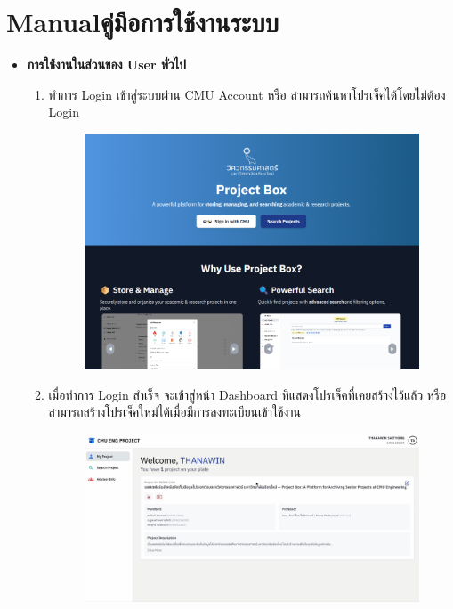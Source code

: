 \chapter{\ifenglish Manual\else คู่มือการใช้งานระบบ\fi}
\begin{itemize}
    \item \textbf{\Large การใช้งานในส่วนของ User ทั่วไป}
\begin{enumerate}
    \item ทำการ Login เข้าสู่ระบบผ่าน CMU Account หรือ สามารถค้นหาโปรเจ็คได้โดยไม่ต้อง Login 
    \begin{figure}[H]
    \centering
    \includegraphics[width=130mm, keepaspectratio ]{pictures/project_box/loginpage.png}
    \end{figure}
    \vspace{1cm}
    \item เมื่อทำการ Login สำเร็จ จะเข้าสู่หน้า Dashboard ที่แสดงโปรเจ็คที่เคยสร้างไว้แล้ว หรือสามารถสร้างโปรเจ็คใหม่ได้เมื่อมีการลงทะเบียนเข้าใช้งาน
    \begin{figure}[H]
        \centering
        \includegraphics[width=130mm, keepaspectratio ]{pictures/project_box/dashboard.png
}
\end{figure}
\end{enumerate}
\end{itemize}
